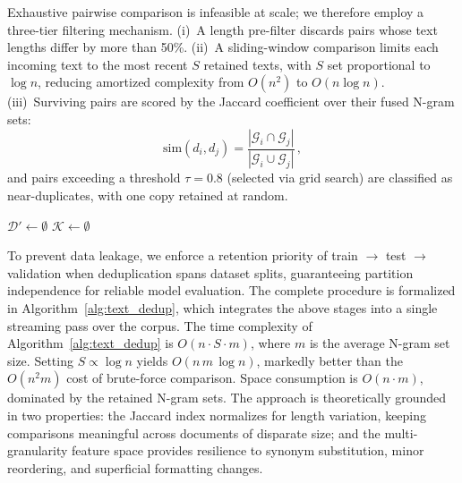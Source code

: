 \documentclass[sigconf, nonacm]{acmart}
\begin{document}
Exhaustive pairwise comparison is infeasible at scale; we therefore employ a three-tier filtering mechanism. (i)~A length pre-filter discards pairs whose text lengths differ by more than 50\%. (ii)~A sliding-window comparison limits each incoming text to the most recent $S$ retained texts, with $S$ set proportional to $\log n$, reducing amortized complexity from $O(n^2)$ to $O(n \log n)$. (iii)~Surviving pairs are scored by the Jaccard coefficient over their fused N-gram sets:
\begin{equation}\label{eq:jaccard_text}
    \mathrm{sim}(d_i, d_j) = \frac{|\mathcal{G}_i \cap \mathcal{G}_j|}{|\mathcal{G}_i \cup \mathcal{G}_j|}\,,
\end{equation}
and pairs exceeding a threshold $\tau = 0.8$ (selected via grid search) are classified as near-duplicates, with one copy retained at random.


\begin{algorithm}[t]
\caption{Multi-Granularity N-gram Text Deduplication}
\label{alg:text_dedup}

$\mathcal{D}' \leftarrow \emptyset$\;
$\mathcal{K} \leftarrow \emptyset$ 


\end{algorithm}


To prevent data leakage, we enforce a retention priority of train $\rightarrow$ test $\rightarrow$ validation when deduplication spans dataset splits, guaranteeing partition independence for reliable model evaluation. The complete procedure is formalized in Algorithm~\ref{alg:text_dedup}, which integrates the above stages into a single streaming pass over the corpus. The time complexity of Algorithm~\ref{alg:text_dedup} is $O(n \cdot S \cdot m)$, where $m$ is the average N-gram set size. Setting $S \propto \log n$ yields $O(n\,m\,\log n)$, markedly better than the $O(n^2 m)$ cost of brute-force comparison. Space consumption is $O(n \cdot m)$, dominated by the retained N-gram sets. The approach is theoretically grounded in two properties: the Jaccard index normalizes for length variation, keeping comparisons meaningful across documents of disparate size; and the multi-granularity feature space provides resilience to synonym substitution, minor reordering, and superficial formatting changes.
\end{document}
